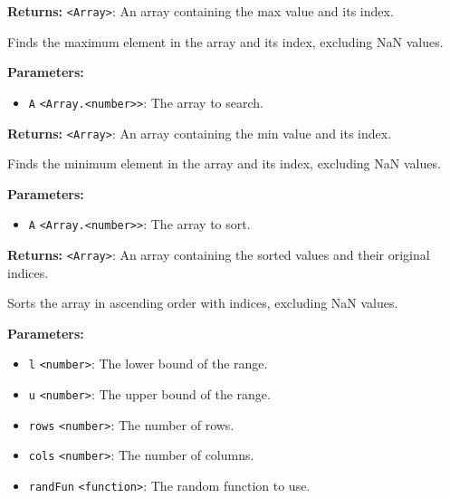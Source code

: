 \documentclass[12pt,a4paper]{article}
\begin{document}
\noindent \textbf{Returns:} \texttt{<Array>}: An array containing the max value and its index.

\noindent Finds the maximum element in the array and its index, excluding NaN values.

\vspace{5mm}
\noindent {}


\noindent \textbf{Parameters:}
\begin{itemize}
  \item \texttt{A} \texttt{<Array.<number>>}: The array to search.
\end{itemize}

\noindent \textbf{Returns:} \texttt{<Array>}: An array containing the min value and its index.

\noindent Finds the minimum element in the array and its index, excluding NaN values.

\vspace{5mm}
\noindent {}


\noindent \textbf{Parameters:}
\begin{itemize}
  \item \texttt{A} \texttt{<Array.<number>>}: The array to sort.
\end{itemize}

\noindent \textbf{Returns:} \texttt{<Array>}: An array containing the sorted values and their original indices.

\noindent Sorts the array in ascending order with indices, excluding NaN values.

\vspace{5mm}
\noindent {}


\noindent \textbf{Parameters:}
\begin{itemize}
  \item \texttt{l} \texttt{<number>}: The lower bound of the range.
  \item \texttt{u} \texttt{<number>}: The upper bound of the range.
  \item \texttt{rows} \texttt{<number>}: The number of rows.
  \item \texttt{cols} \texttt{<number>}: The number of columns.
  \item \texttt{randFun} \texttt{<function>}: The random function to use.
\end{itemize}
\end{document}
